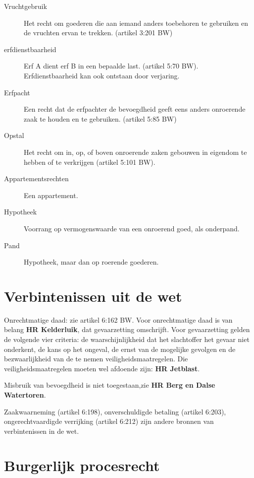 \documentclass{article}
\begin{document}
\begin{description}

  \item[Vruchtgebruik] Het recht om goederen die aan iemand anders toebehoren
    te gebruiken en de vruchten ervan te trekken. (artikel 3:201 BW)

  \item[erfdienstbaarheid] Erf A dient erf B in een bepaalde last. (artikel
    5:70 BW). Erfdienstbaarheid kan ook ontstaan door verjaring.

  \item[Erfpacht] Een recht dat de erfpachter de bevoegdheid geeft eens anders
    onroerende zaak te houden en te gebruiken. (artikel 5:85 BW)

  \item[Opstal] Het recht om in, op, of boven onroerende zaken gebouwen in
    eigendom te hebben of te verkrijgen (artikel 5:101 BW).

  \item[Appartementsrechten] Een appartement.

  \item[Hypotheek] Voorrang op vermogenswaarde van een onroerend goed, als
    onderpand.

  \item[Pand] Hypotheek, maar dan op roerende goederen.

\end{description}

\section{Verbintenissen uit de wet}

Onrechtmatige daad: zie artikel 6:162 BW. Voor onrechtmatige daad is van belang
\textbf{HR Kelderluik}, dat gevaarzetting omschrijft. Voor gevaarzetting gelden
de volgende vier criteria: de waarschijnlijkheid dat het slachtoffer het gevaar
niet onderkent, de kans op het ongeval, de ernst van de mogelijke gevolgen en
de bezwaarlijkheid van de te nemen veiligheidsmaatregelen. Die
veiligheidsmaatregelen moeten wel afdoende zijn: \textbf{HR Jetblast}.

Misbruik van bevoegdheid is niet toegestaan,zie \textbf{HR Berg en Dalse
Watertoren}.

Zaakwaarneming (artikel 6:198), onverschuldigde betaling (artikel 6:203),
ongerechtvaardigde verrijking (artikel 6:212) zijn andere bronnen van
verbintenissen in de wet.

\section{Burgerlijk procesrecht}
\end{document}
